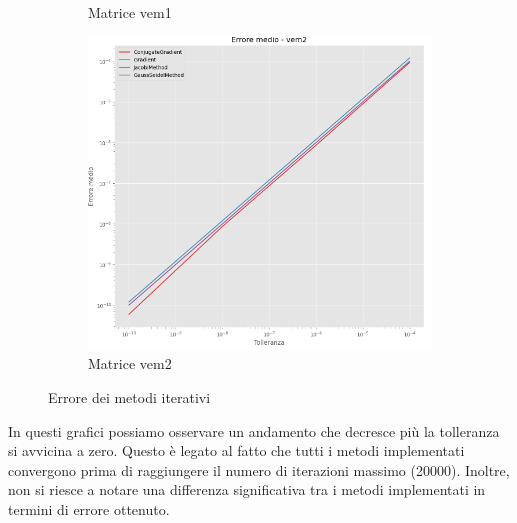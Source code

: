 \begin{figure}[!ht]
\begin{subfigure}{0.45\textwidth}
        \caption{Matrice vem1}
        \label{fig:error_vem1}
    \end{subfigure}
    \begin{subfigure}{0.45\textwidth}
        \centering
        \includegraphics[width=\textwidth]{./../report/Progetto_1_bis/img/error_vem2.png}
        \caption{Matrice vem2}
        \label{fig:error_vem2}
    \end{subfigure}
    \caption{Errore dei metodi iterativi}
    \label{fig:error}
\end{figure}

In questi grafici possiamo osservare un andamento che decresce più la tolleranza
si avvicina a zero. Questo è legato al fatto che tutti i metodi implementati
convergono prima di raggiungere il numero di iterazioni massimo (20000). Inoltre,
non si riesce a notare una differenza significativa tra i metodi implementati in termini
di errore ottenuto.

